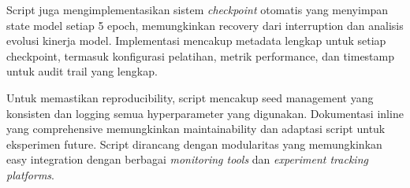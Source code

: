 Script juga mengimplementasikan sistem \emph{checkpoint} otomatis yang menyimpan state model setiap 5 epoch, memungkinkan recovery dari interruption dan analisis evolusi kinerja model. Implementasi mencakup metadata lengkap untuk setiap checkpoint, termasuk konfigurasi pelatihan, metrik performance, dan timestamp untuk audit trail yang lengkap.

Untuk memastikan reproducibility, script mencakup seed management yang konsisten dan logging semua hyperparameter yang digunakan. Dokumentasi inline yang comprehensive memungkinkan maintainability dan adaptasi script untuk eksperimen future. Script dirancang dengan modularitas yang memungkinkan easy integration dengan berbagai \emph{monitoring tools} dan \emph{experiment tracking platforms}.
